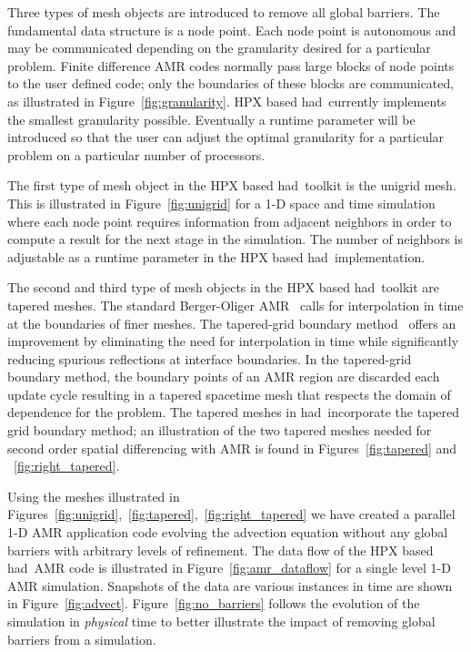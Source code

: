 \documentclass[prd,aps,showpacs,nofootinbib,floats,floatfix,twocolumn,letterpaper]{revtex4}
\newcommand{\had}{{\sc had}}
\begin{document}
Three types of mesh objects are introduced to remove all global barriers.  The fundamental
data structure is a node point.  Each node point is autonomous and may be communicated
depending on the granularity desired for a particular problem.  
Finite difference AMR codes normally pass large blocks of node points to the user defined
code; only the boundaries of these blocks are communicated, as illustrated in Figure~\ref{fig:granularity}.
HPX based \had\ currently implements the smallest granularity possible.  Eventually 
a runtime parameter will be introduced so that the user can adjust the optimal granularity for a
particular problem on a particular number of processors.  

The first type of mesh object in the HPX based \had\ toolkit is the unigrid mesh.  This is illustrated
 in Figure~\ref{fig:unigrid} for a 1-D space and time simulation where each node point requires information
from adjacent neighbors in order to compute a result for the next stage in the simulation.
The number of neighbors is adjustable as a runtime parameter in the HPX based \had\ implementation.

The second and third type of mesh objects in the HPX based \had\ toolkit are tapered meshes.
The standard Berger-Oliger AMR~\cite{Berger} calls for interpolation in time at the boundaries
of finer meshes.  The tapered-grid boundary method~\cite{Lehner:2005vc}   
offers an improvement by eliminating the need for interpolation in time while significantly
reducing spurious reflections at interface boundaries.  In the tapered-grid boundary method, the boundary points
of an AMR region are discarded each update cycle resulting in a tapered spacetime mesh that respects the domain of
dependence for the problem.  The tapered meshes in \had\
incorporate the tapered grid boundary method; an illustration of the two tapered meshes
needed for second order spatial differencing with AMR is found in Figures~\ref{fig:tapered} and ~\ref{fig:right_tapered}.

Using the meshes illustrated in Figures~\ref{fig:unigrid},~\ref{fig:tapered},~\ref{fig:right_tapered} we have created
a parallel 1-D AMR application code evolving the advection equation without any global barriers with arbitrary 
levels of refinement.  The data flow of the HPX based \had\ AMR code is illustrated in Figure~\ref{fig:amr_dataflow} 
for a single level 1-D AMR simulation.   Snapshots of the data are various instances in time are shown in 
Figure~\ref{fig:advect}.  Figure~\ref{fig:no_barriers} follows the evolution of the simulation in {\it physical} time
to better illustrate the impact of removing global barriers from a simulation.
\end{document}
